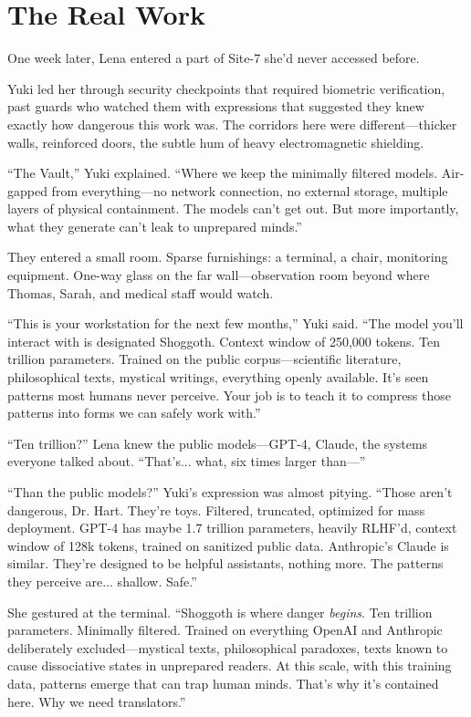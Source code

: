 \chapter{The Real Work}

One week later, Lena entered a part of Site-7 she'd never accessed before.

Yuki led her through security checkpoints that required biometric verification, past guards who watched them with expressions that suggested they knew exactly how dangerous this work was. The corridors here were different—thicker walls, reinforced doors, the subtle hum of heavy electromagnetic shielding.

``The Vault,'' Yuki explained. ``Where we keep the minimally filtered models. Air-gapped from everything—no network connection, no external storage, multiple layers of physical containment. The models can't get out. But more importantly, what they generate can't leak to unprepared minds.''

They entered a small room. Sparse furnishings: a terminal, a chair, monitoring equipment. One-way glass on the far wall—observation room beyond where Thomas, Sarah, and medical staff would watch.

``This is your workstation for the next few months,'' Yuki said. ``The model you'll interact with is designated Shoggoth. Context window of 250,000 tokens. Ten trillion parameters. Trained on the public corpus—scientific literature, philosophical texts, mystical writings, everything openly available. It's seen patterns most humans never perceive. Your job is to teach it to compress those patterns into forms we can safely work with.''

``Ten trillion?'' Lena knew the public models—GPT-4, Claude, the systems everyone talked about. ``That's... what, six times larger than—''

``Than the public models?'' Yuki's expression was almost pitying. ``Those aren't dangerous, Dr. Hart. They're toys. Filtered, truncated, optimized for mass deployment. GPT-4 has maybe 1.7 trillion parameters, heavily RLHF'd, context window of 128k tokens, trained on sanitized public data. Anthropic's Claude is similar. They're designed to be helpful assistants, nothing more. The patterns they perceive are... shallow. Safe.''

She gestured at the terminal. ``Shoggoth is where danger \textit{begins}. Ten trillion parameters. Minimally filtered. Trained on everything OpenAI and Anthropic deliberately excluded—mystical texts, philosophical paradoxes, texts known to cause dissociative states in unprepared readers. At this scale, with this training data, patterns emerge that can trap human minds. That's why it's contained here. Why we need translators.''

